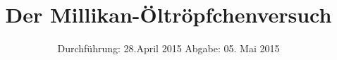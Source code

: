 
\subject{Anfängerpraktikum V503}
\title{Der Millikan-Öltröpfchenversuch}
\date{
  Durchführung: 28.April 2015
  \hspace{3em}
  Abgabe: 05. Mai 2015
}


\maketitle
\thispagestyle{empty}
\newpage





\nocite{skript}
\printbibliography
